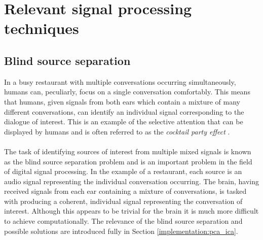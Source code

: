 \section{Relevant signal processing techniques}
\subsection{Blind source separation}
\label{ref:bss_prep}
In a busy restaurant with multiple conversations occurring simultaneously, humans can, peculiarly, focus on a single conversation comfortably.
This means that humans, given signals from both ears which contain a mixture of many different conversations, can identify an individual signal corresponding to the dialogue
of interest.
This is an example of the selective attention that can be displayed by humans and is often referred to as the \textit{cocktail party effect} \cite{Cherry}.
\\\\
The task of identifying sources of interest from multiple mixed signals is known as the blind source separation problem and is an important problem in the field of digital 
signal processing. 
In the example of a restaurant, each source is an audio signal representing the individual conversation occurring. The brain, having received signals 
from each ear containing a mixture of conversations, is tasked with producing a coherent, individual signal representing the conversation of interest. Although this appears
to be trivial for the brain it is much more difficult to achieve computationally.
The relevance of the blind source separation and possible solutions are introduced fully in Section \ref{implementation:pca_ica}.





